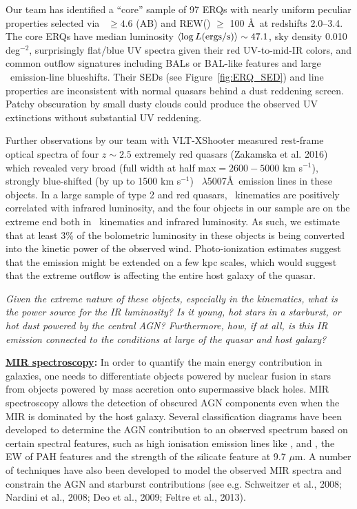 \vspace{-22pt}
\noindent
Our team has identified a ``core'' sample of 97 ERQs with nearly uniform
peculiar properties selected via \imw\ $\ge 4.6$ (AB) and REW(\civ )
$\ge$ 100 \AA\ at redshifts 2.0--3.4.  The core ERQs have median
luminosity $\left<\log L ({\rm ergs/s})\right> \sim 47.1$, sky density
0.010 deg$^{-2}$, surprisingly flat/blue UV spectra given their red
UV-to-mid-IR colors, and common outflow signatures including BALs or
BAL-like features and large \civ\ emission-line blueshifts. Their
SEDs (see Figure~\ref{fig:ERQ_SED}) and line properties are
inconsistent with normal quasars behind a dust reddening
screen. Patchy obscuration by small dusty clouds could produce the
observed UV extinctions without substantial UV reddening.


\smallskip
\smallskip
\noindent
Further observations by our team with VLT-XShooter measured rest-frame
optical spectra of four $z\sim 2.5$ extremely red quasars (Zakamska et al. 2016) 
which revealed very broad (full width at half max$= 2600-5000$ km
s$^{-1}$), strongly blue-shifted (by up to 1500 km s$^{-1}$)
\oiii\ $\lambda$5007\AA\ emission lines in these objects. In a large
sample of type 2 and red quasars, \oiii\ kinematics are positively
correlated with infrared luminosity, and the four objects in our
sample are on the extreme end both in \oiii\ kinematics and infrared
luminosity.
As such, we estimate that at least 3\% of the bolometric luminosity in
these objects is being converted into the kinetic power of the
observed wind. Photo-ionization estimates suggest that the \oiii
emission might be extended on a few kpc scales, which would suggest
that the extreme outflow is affecting the entire host galaxy of the
quasar.

\smallskip
\smallskip
\noindent
{\it Given the extreme nature of these objects, especially in the 
kinematics,  what is the power source for the IR luminosity? 
Is it young, hot stars in a starburst, or hot dust powered by the central AGN?
Furthermore, how, if at all, is this IR emission connected to the
conditions at large of the quasar and host galaxy?}

\smallskip
\smallskip
\noindent
{\bf \underline{MIR spectroscopy}:}
In order to quantify the main energy contribution in galaxies, one
needs to differentiate objects powered by nuclear fusion in stars 
from objects powered by mass accretion onto supermassive black holes.
MIR spectroscopy allows the detection of obscured AGN components even
when the MIR is dominated by the host galaxy. Several classification
diagrams have been developed to determine the AGN contribution to an
observed spectrum based on certain spectral features, such as high
ionisation emission lines like \nev, \neii and \oiv, the EW of PAH
features and the strength of the silicate feature at 9.7 $\mu$m. A number of techniques have
also been developed to model the observed MIR spectra and constrain
the AGN and starburst contributions (see e.g. Schweitzer et al., 2008;
Nardini et al., 2008; Deo et al., 2009; Feltre et al., 2013).

